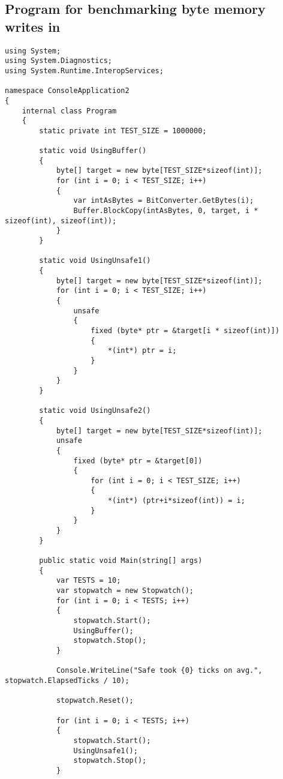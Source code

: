 \begin{appendices}
\chapter{Program for benchmarking byte memory writes in \csharp{}}
\begin{verbatim}
using System;
using System.Diagnostics;
using System.Runtime.InteropServices;

namespace ConsoleApplication2
{
    internal class Program
    {
        static private int TEST_SIZE = 1000000;
        
        static void UsingBuffer()
        {
            byte[] target = new byte[TEST_SIZE*sizeof(int)];
            for (int i = 0; i < TEST_SIZE; i++)
            {
                var intAsBytes = BitConverter.GetBytes(i);
                Buffer.BlockCopy(intAsBytes, 0, target, i * sizeof(int), sizeof(int)); 
            }
        }
        
        static void UsingUnsafe1()
        {
            byte[] target = new byte[TEST_SIZE*sizeof(int)];
            for (int i = 0; i < TEST_SIZE; i++)
            {
                unsafe
                {
                    fixed (byte* ptr = &target[i * sizeof(int)])
                    {
                        *(int*) ptr = i;
                    }
                }
            }
        }
        
        static void UsingUnsafe2()
        {
            byte[] target = new byte[TEST_SIZE*sizeof(int)];
            unsafe
            {
                fixed (byte* ptr = &target[0])
                {
                    for (int i = 0; i < TEST_SIZE; i++)
                    {
                        *(int*) (ptr+i*sizeof(int)) = i;
                    }
                }
            }
        }

        public static void Main(string[] args)
        {
            var TESTS = 10;
            var stopwatch = new Stopwatch();
            for (int i = 0; i < TESTS; i++)
            {
                stopwatch.Start();
                UsingBuffer();
                stopwatch.Stop();
            }

            Console.WriteLine("Safe took {0} ticks on avg.", stopwatch.ElapsedTicks / 10);

            stopwatch.Reset();

            for (int i = 0; i < TESTS; i++)
            {
                stopwatch.Start();
                UsingUnsafe1();
                stopwatch.Stop();
            }


\end{verbatim}
\end{appendices}
